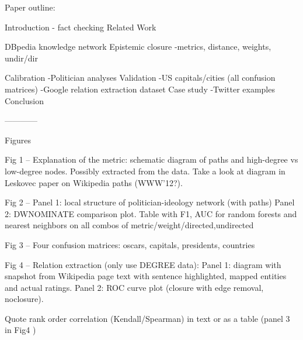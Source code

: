 Paper outline:

Introduction - fact checking
Related Work

DBpedia knowledge network
Epistemic closure
	-metrics, distance, weights, undir/dir

Calibration
	-Politician analyses
Validation
	-US capitals/cities (all confusion matrices)
	-Google relation extraction dataset
Case study
	-Twitter examples
Conclusion

------------

Figures

Fig 1 -- Explanation of the metric: schematic diagram of paths and high-degree
vs low-degree nodes. Possibly extracted from the data. Take a look at diagram in
Leskovec paper on Wikipedia paths (WWW'12?).

Fig 2 -- Panel 1: local structure of politician-ideology network (with paths)
Panel 2: DWNOMINATE comparison plot. Table with F1, AUC for random forests and
nearest neighbors on all combos of metric/weight/{directed,undirected}

Fig 3 -- Four confusion matrices: oscars, capitals, presidents, countries

Fig 4 -- Relation extraction (only use DEGREE data): Panel 1: diagram with
snapshot from Wikipedia page text with sentence highlighted, mapped entities and
actual ratings. Panel 2: ROC curve plot (closure with edge removal, noclosure).

Quote rank order correlation (Kendall/Spearman) in text or as a table (panel 3
in Fig4 )
